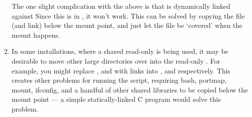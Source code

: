 \begin{enumerate}

  The one slight complication with the above is that
  {} is dynamically linked against
  {} Since this is in {}, it
  won't work. This can be solved by copying the file (and link) below
  the {} mount point, and just let the file be `covered' when
  the mount happens.

\item In some installations, where a shared read-only {} is
  being used, it may be desirable to move other large directories over
  into the read-only {}. For example, you might replace
  {}, {} and {} with links into
  {}, {} and
  {} respectively. This creates other problems for
  running the {} script, requiring bash, portmap, mount,
  ifconfig, and a handful of other shared libraries to be copied below
  the mount point --- a simple statically-linked C program would solve
  this problem.

\end{enumerate}